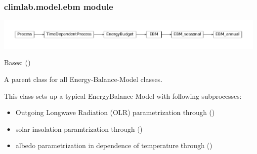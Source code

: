 \documentclass[a4paper,10pt,english]{sphinxmanual}
\begin{document}
\subsubsection{climlab.model.ebm module}
\label{api/climlab.model:climlab-model-ebm-module}
\includegraphics{inheritance-6f4ff43846d3dd82bca0c822ba5c6598e2c24b73.pdf}
\label{api/climlab.model:module-climlab.model.ebm}

\begin{fulllineitems}
\label{api/climlab.model:climlab.model.ebm.EBM}
Bases: {\hyperref[api/climlab.process:climlab.process.energy_budget.EnergyBudget]{\emph{}}} ()

A parent class for all Energy-Balance-Model classes.

This class sets up a typical EnergyBalance Model with following subprocesses:
\begin{itemize}
\item {} 
Outgoing Longwave Radiation (OLR) parametrization through 
{\hyperref[api/climlab.radiation:climlab.radiation.AplusBT.AplusBT]{\emph{}}} ()

\item {} 
solar insolation paramtrization through 
{\hyperref[api/climlab.radiation:climlab.radiation.insolation.P2Insolation]{\emph{}}} ()

\item {} 
albedo parametrization in dependence of temperature through
{\hyperref[api/climlab.surface:climlab.surface.albedo.StepFunctionAlbedo]{\emph{}}} ()


\end{itemize}
\end{fulllineitems}
\end{document}
